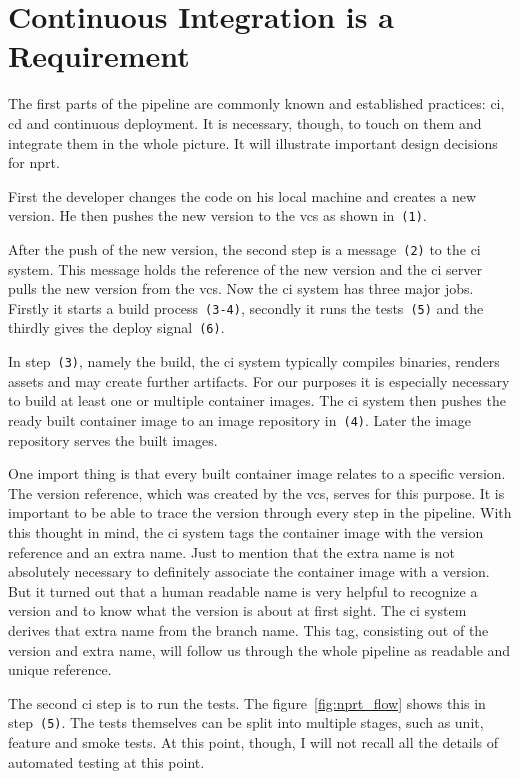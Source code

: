 \section{Continuous Integration is a Requirement}

The first parts of the pipeline are commonly known and established practices: \gls{ci},
\gls{cd} and continuous deployment. It is necessary, though, to touch on them and
integrate them in the whole picture. It will illustrate important design decisions for
\gls{nprt}.

First the developer changes the code on his local machine and creates a new version. He
then pushes the new version to the \gls{vcs} as shown in~\texttt{(1)}.

After the push of the new version, the second step is a message~\texttt{(2)} to the
\gls{ci} system. This message holds the reference of the new version and the \gls{ci}
server pulls the new version from the \gls{vcs}. Now the \gls{ci} system has three major
jobs. Firstly it starts a build process~\texttt{(3-4)}, secondly it runs the
tests~\texttt{(5)} and the thirdly gives the deploy signal~\texttt{(6)}.

In step~\texttt{(3)}, namely the build, the \gls{ci} system typically compiles binaries,
renders assets and may create further artifacts. For our purposes it is especially
necessary to build at least one or multiple container images. The \gls{ci} system then
pushes the ready built container image to an image repository in~\texttt{(4)}. Later the
image repository serves the built images.

One import thing is that every built container image relates to a specific version. The
version reference, which was created by the \gls{vcs}, serves for this purpose. It is
important to be able to trace the version through every step in the pipeline. With this
thought in mind, the \gls{ci} system tags the container image with the version reference
and an extra name. Just to mention that the extra name is not absolutely necessary to
definitely associate the container image with a version. But it turned out that a human
readable name is very helpful to recognize a version and to know what the version is about
at first sight. The \gls{ci} system derives that extra name from the branch name. This
tag, consisting out of the version and extra name, will follow us through the whole
pipeline as readable and unique reference.

The second \gls{ci} step is to run the tests. The figure~\ref{fig:nprt_flow} shows this in
step~\texttt{(5)}. The tests themselves can be split into multiple stages, such as unit,
feature and smoke tests. At this point, though, I will not recall all the details of
automated testing at this point.

